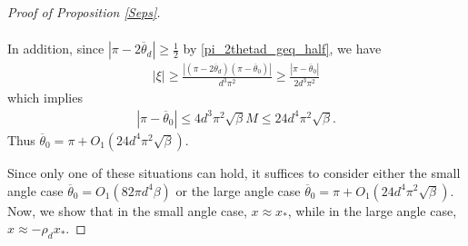 \documentclass[11pt]{article}
\theoremstyle{remark}
\begin{document}
\begin{proof}[Proof of Proposition \ref{Seps}]
\begin{itemize}
\begin{align*}
\end{align*} In addition, since
$|\pi - 2\overline{\theta}_d| \geqslant \frac{1}{2}$ by \eqref{pi_2thetad_geq_half}, we have  \begin{align*}
|\xi| \geqslant \frac{|(\pi - 2\overline{\theta}_d)(\pi - \overline{\theta}_0)|}{d^3 \pi^2} \geqslant \frac{|\pi - \overline{\theta}_0|}{2d^3\pi^2}
\end{align*} which implies \begin{align*}
|\pi - \overline{\theta}_0| \leqslant 4d^3\pi^2\sqrt{\beta}M \leqslant 24d^4\pi^2 \sqrt{\beta}.
\end{align*} Thus $\overline{\theta}_0 = \pi + O_1(24d^4\pi^2 \sqrt{\beta})$.
\end{itemize}

Since only one of these situations can hold, it suffices to consider either the small angle case $\overline{\theta}_0 = O_1(82\pi d^4 \beta)$ or the large angle case $\overline{\theta}_0 = \pi + O_1(24d^4\pi^2\sqrt{\beta})$. Now, we show that in the small angle case, $x \approx x_*$, while in the large angle case, $x \approx -\rho_d x_*$.


\end{proof}
\end{document}
